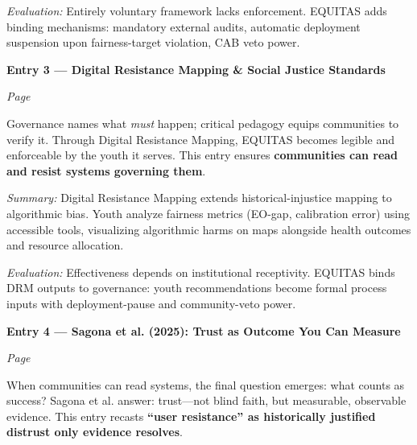 \documentclass[11pt,twoside]{article}
\begin{document}
\vspace{0.1cm}

\noindent \hspace{1cm} \textit{Evaluation:} Entirely voluntary framework lacks enforcement. EQUITAS adds binding mechanisms: mandatory external audits, automatic deployment suspension upon fairness-target violation, CAB veto power.

\vspace{0.5cm}

\noindent\textbf{\large Entry 3 --- Digital Resistance Mapping \& Social Justice Standards}\hfill

\textit{Page \pageref{entry3}}

\vspace{0.2cm}

\noindent Governance names what \emph{must} happen; critical pedagogy equips communities to verify it. Through Digital Resistance Mapping, EQUITAS becomes legible and enforceable by the youth it serves. This entry ensures \textbf{communities can read and resist systems governing them}.

\vspace{0.3cm}

\noindent \hspace{1cm} \textit{Summary:} Digital Resistance Mapping extends historical-injustice mapping to algorithmic bias. Youth analyze fairness metrics (EO-gap, calibration error) using accessible tools, visualizing algorithmic harms on maps alongside health outcomes and resource allocation.

\vspace{0.1cm}

\noindent \hspace{1cm} \textit{Evaluation:} Effectiveness depends on institutional receptivity. EQUITAS binds DRM outputs to governance: youth recommendations become formal process inputs with deployment-pause and community-veto power.

\vspace{0.5cm}

\noindent\textbf{\large Entry 4 --- Sagona et al. (2025): Trust as Outcome You Can Measure}\hfill

\textit{Page \pageref{entry4}}

\vspace{0.2cm}

\noindent When communities can read systems, the final question emerges: what counts as success? Sagona et al. answer: trust---not blind faith, but measurable, observable evidence. This entry recasts \textbf{``user resistance'' as historically justified distrust only evidence resolves}.
\end{document}
